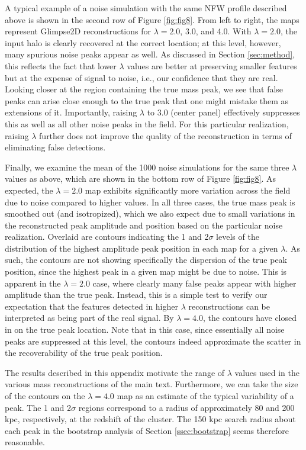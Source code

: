 \documentclass[iop,twocolappendix]{emulateapj}
\begin{document}
A typical example of a noise simulation with the same NFW profile described above is shown in
the second row of Figure \ref{fig:fig8}. From left to right, the maps represent Glimpse2D 
reconstructions for $\lambda=2.0$, 3.0, and 4.0. With $\lambda=2.0$, the input halo is clearly
recovered at the correct location; at this level, however, many spurious noise peaks appear as 
well. As discussed in Section \ref{sec:method}, this reflects the fact that lower $\lambda$ 
values are better at preserving smaller features but at the expense of signal to noise, i.e.,
our confidence that they are real. Looking closer at the region containing the true mass peak, 
we see that false peaks can arise close enough to the true peak that one might mistake them 
as extensions of it. Importantly, raising $\lambda$ to 3.0 (center panel) effectively suppresses 
this as well as all other noise peaks in the field. For this particular realization, raising 
$\lambda$ further does not improve the quality of the reconstruction in terms of eliminating 
false detections.

Finally, we examine the mean of the 1000 noise simulations for the same three $\lambda$
values as above, which are shown in the bottom row of Figure \ref{fig:fig8}. As expected, the
$\lambda=2.0$ map exhibits significantly more variation across the field due to noise compared 
to higher values. In all three cases, the true mass peak is smoothed out (and isotropized),
which we also expect due to small variations in the reconstructed peak amplitude and position
based on the particular noise realization. Overlaid are contours indicating the 1 and 2$\sigma$ 
levels of the distribution of the highest amplitude peak position in each map for a given 
$\lambda$. As such, the contours are not showing specifically the dispersion of the true
peak position, since the highest peak in a given map might be due to noise. This is apparent
in the $\lambda=2.0$ case, where clearly many false peaks appear with higher amplitude than
the true peak. Instead, this is a simple test to verify our expectation that the features
detected in higher $\lambda$ reconstructions can be interpreted as being part of the real 
signal. By $\lambda=4.0$, the contours have closed in on the true peak location. Note that in 
this case, since essentially all noise peaks are suppressed at this level, the contours 
indeed approximate the scatter in the recoverability of the true peak position.

The results described in this appendix motivate the range of $\lambda$ values used 
in the various mass reconstructions of the main text. Furthermore, we can take the size of 
the contours on the $\lambda=4.0$ map as an estimate of the typical variability of a peak. 
The 1 and 2$\sigma$ regions correspond to a radius of approximately 80 and 200 kpc, respectively, 
at the redshift of the cluster. The 150 kpc search radius about each peak in the bootstrap 
analysis of Section \ref{ssec:bootstrap} seems therefore reasonable.



\end{document}
